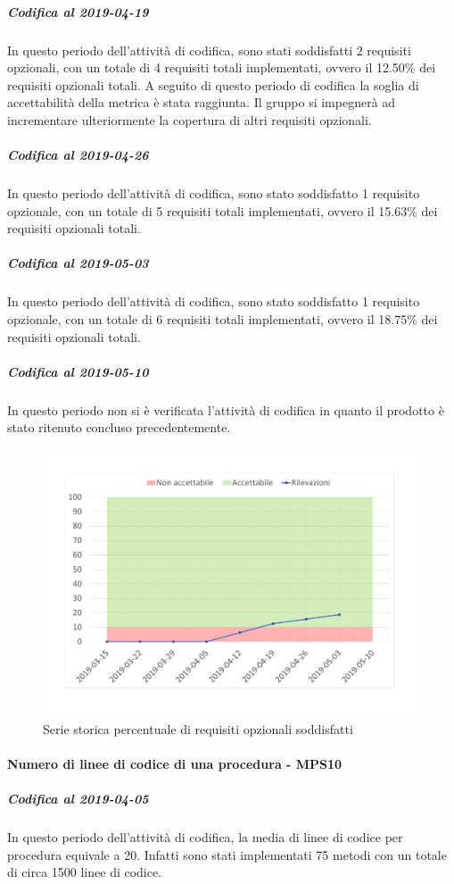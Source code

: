 \subparagraph{Codifica al 2019-04-19}
In questo periodo dell'attività di codifica, sono stati soddisfatti 2 requisiti opzionali, con un totale di 4 requisiti totali implementati, ovvero il 12.50\% dei requisiti opzionali totali.
A seguito di questo periodo di codifica la soglia di accettabilità della metrica è stata raggiunta.
Il gruppo si impegnerà ad incrementare ulteriormente la copertura di altri requisiti opzionali.

\subparagraph{Codifica al 2019-04-26}
In questo periodo dell'attività di codifica, sono stato soddisfatto 1 requisito opzionale, con un totale di 5 requisiti totali implementati, ovvero il 15.63\% dei requisiti opzionali totali.

\subparagraph{Codifica al 2019-05-03}
In questo periodo dell'attività di codifica, sono stato soddisfatto 1 requisito opzionale, con un totale di 6 requisiti totali implementati, ovvero il 18.75\% dei requisiti opzionali totali.

\subparagraph{Codifica al 2019-05-10}
In questo periodo non si è verificata l'attività di codifica in quanto il prodotto è stato ritenuto concluso precedentemente.

\begin{figure}[H]
	\centering
	\includegraphics[scale=0.6]{images/resoconto/MPS9Chart.pdf}
	\caption{Serie storica percentuale di requisiti opzionali soddisfatti}	
\end{figure}

\paragraph{Numero di linee di codice di una procedura - MPS10}
\subparagraph{Codifica al 2019-04-05}
In questo periodo dell'attività di codifica, la media di linee di codice per procedura equivale a 20. Infatti sono stati implementati 75 metodi con un totale di circa 1500 linee di codice.

